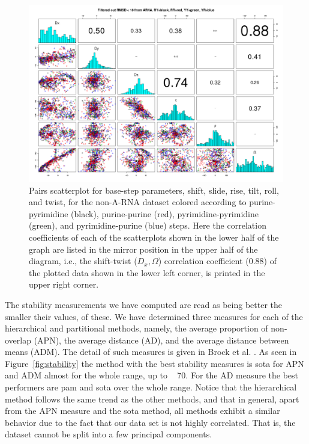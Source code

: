 \begin{figure}
 \centering
\includegraphics[angle=90, scale=0.5]{Chapter2/noarna_step.png}
\caption{Pairs  scatterplot for  base-step  parameters, shift,  slide,
rise,  tilt,  roll,  and  twist,  for the  non-A-RNA  dataset  colored
according   to   purine-pyrimidine   (black),   purine-purine   (red),
pyrimidine-pyrimidine    (green),    and   pyrimidine-purine    (blue)
steps. Here  the correlation coefficients of each  of the scatterplots
shown in the lower half of the graph are listed in the mirror position
in  the upper  half of  the  diagram, i.e.,  the shift-twist  ($D_{x},
\Omega$) correlation  coefficient (0.88) of the plotted  data shown in
the lower left corner, is printed in the upper right corner.}
 \label{fig:pairsnoarna}
\end{figure}

The stability measurements  we have computed are read  as being better
the smaller their values, of  these. We have determined three measures
for  each of  the hierarchical  and partitional  methods,  namely, the
average proportion  of non-overlap  (APN), the average  distance (AD),
and  the average  distance between  means (ADM).   The detail  of such
measures  is given  in Brock  et  al.  \cite{brock2008}.   As seen  in
Figure~\ref{fig:stability} the method with the best stability measures
is sota for APN  and ADM almost for the whole range,  up to ~ 70.  For
the AD  measure the best  performers are pam  and sota over  the whole
range.  Notice that the hierarchical  method follows the same trend as
the other methods, and that in general, apart from the APN measure and
the sota  method, all  methods exhibit a  similar behavior due  to the
fact that our data set is  not highly correlated. That is, the dataset
cannot be split into a few principal components.

